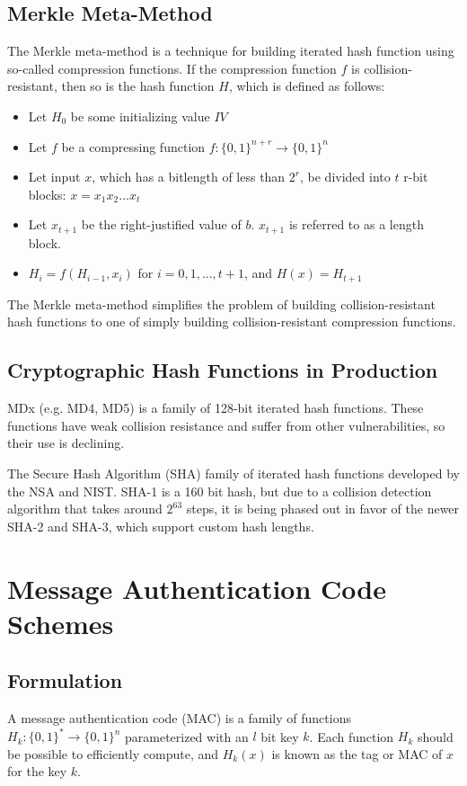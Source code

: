 \documentclass[12pt,titlepage]{article}
\let\stdsection\section
\renewcommand\section{\clearpage\stdsection}
\begin{document}
    \subsection{Merkle Meta-Method}
      The Merkle meta-method is a technique for building iterated hash function using so-called compression functions. If the compression function $f$ is collision-resistant,
      then so is the hash function $H$, which is defined as follows:
        \begin{itemize}
          \item Let $H_0$ be some initializing value $IV$
          \item Let $f$ be a compressing function $f : \{0, 1\}^{n+r} \rightarrow \{0, 1\}^n$
          \item Let input $x$, which has a bitlength of less than $2^r$, be divided into $t$ r-bit blocks: $x = x_1x_2 . . . x_t$
          \item Let $x_{t+1}$ be the right-justified value of $b$. $x_{t+1}$ is referred to as a length block.
          \item $H_i = f(H_{i-1}, x_i)$ for $i = 0, 1, ..., t + 1$, and $H(x) = H_{t+1}$
        \end{itemize}

      The Merkle meta-method simplifies the problem of building collision-resistant hash functions to one of simply building collision-resistant compression functions.

    \subsection{Cryptographic Hash Functions in Production}
      MDx (e.g. MD4, MD5) is a family of 128-bit iterated hash functions. These functions have weak collision resistance and suffer from other vulnerabilities, so their use
      is declining.

      The Secure Hash Algorithm (SHA) family of iterated hash functions developed by the NSA and NIST. SHA-1 is a 160 bit hash, but due to a collision detection algorithm
      that takes around $2^{63}$ steps, it is being phased out in favor of the newer SHA-2 and SHA-3, which support custom hash lengths.

  \section{Message Authentication Code Schemes}

    \subsection{Formulation}
      A message authentication code (MAC) is a family of functions $H_k: \{0, 1\}^* \rightarrow \{0, 1\}^n$ parameterized with an $l$ bit key $k$. Each function $H_k$ should
      be possible to efficiently compute, and $H_k(x)$ is known as the tag or MAC of $x$ for the key $k$.
\end{document}
